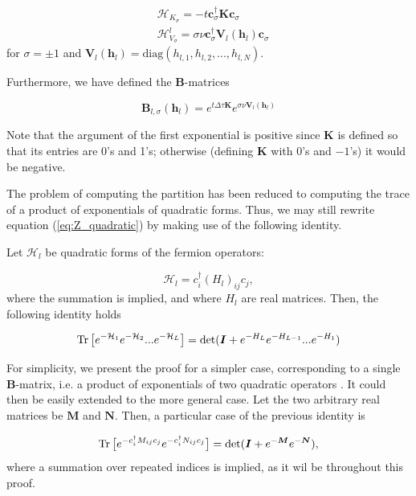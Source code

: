 \begin{equation}
\begin{split}
&\mathcal{H}_{K_\sigma} = - t \bm c_\sigma^\dagger \bm K \bm c_\sigma \\
&\mathcal{H}_{V_\sigma}^l = \sigma \nu \bm c_\sigma^\dagger \bm V_l (\bm h_l) \bm c_\sigma
\end{split}
\end{equation}
for $\sigma = \pm 1$ and $\bm V_l ( \bm h_l ) = \text{diag} ( h_{l, 1} , h_{l, 2}, ... , h_{l, N} )$.

Furthermore, we have defined the $\bm B$-matrices

\begin{equation}
\bm B_{l, \sigma} ( \bm h_l ) = e^{t \Delta \tau \bm K} e^{\sigma \nu \bm V_l (\bm h_l)}
\end{equation}

Note that the argument of the first exponential is positive since $\bm K$ is defined so that its entries are 0's and 1's; otherwise (defining $\bm K$ with 0's and $-1$'s) it would be negative.

The problem of computing the partition has been reduced to computing the trace of a product of exponentials of quadratic forms. Thus, we may still rewrite equation (\ref{eq:Z_quadratic}) by making use of the following identity.

Let $\mathcal{H}_l$ be quadratic forms of the fermion operators:

\begin{equation}
\mathcal{H}_l = c_i^\dagger (H_l)_{ij} c_j,
\end{equation}
where the summation is implied, and where $H_l$ are real matrices. Then, the following identity holds

\begin{equation}\label{eq:quadraticIdentity}
\operatorname{Tr} \big[ e^{-\mathcal{H}_1 } e^{-\mathcal{H}_2 } ... e^{-\mathcal{H}_L } \big] = \text{det} ( \bm I + e^{-H_L} e^{-H_{L-1}} ... e^{-H_1} )
\end{equation}

For simplicity, we present the proof for a simpler case, corresponding to a single $\bm B$-matrix, i.e. a product of exponentials of two quadratic operators \cite{Hirsch1985}. It could then be easily extended to the more general case. Let the two arbitrary real matrices be $\bm M$ and $\bm N$. Then, a particular case of the previous identity is

\begin{equation}\label{eq:particularIdentity}
\operatorname{Tr} \big[ e^{-c_i^\dagger M_{ij} c_j} e^{-c_i^\dagger N_{ij} c_j} \big] = \text{det} ( \bm I + e^{-{\bm M}} e^{-{\bm N}} ) ,
\end{equation}
where a summation over repeated indices is implied, as it wil be throughout this proof.

